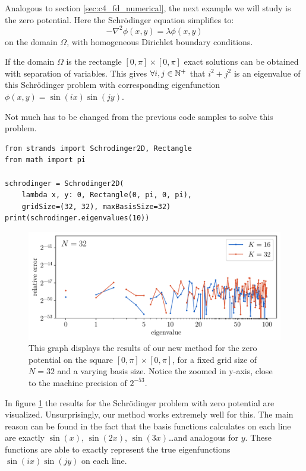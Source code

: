 Analogous to section \ref{sec:c4_fd_numerical}, the next example we will study is the zero potential. Here the Schrödinger equation simplifies to:
$$
    -\nabla^2 \phi(x, y) = \lambda\phi(x, y)
$$
on the domain $\Omega$, with homogeneous Dirichlet boundary conditions.

If the domain $\Omega$ is the rectangle $[0, \pi] \times [0, \pi]$ exact solutions can be obtained with separation of variables. This gives $\forall i, j \in \mathbb{N}^{+}$ that $i^2 + j^2$ is an eigenvalue of this Schrödinger problem with corresponding eigenfunction $\phi(x, y) = \sin(i x)\sin(j y)$.

Not much has to be changed from the previous code samples to solve this problem.
\begin{verbatim}
from strands import Schrodinger2D, Rectangle
from math import pi

schrodinger = Schrodinger2D(
    lambda x, y: 0, Rectangle(0, pi, 0, pi),
    gridSize=(32, 32), maxBasisSize=32)
print(schrodinger.eigenvalues(10))
\end{verbatim}

\begin{figure}
    \begin{center}
        \includegraphics[width=\textwidth]{img/chapter4/nm_test_zero_rectangle.pdf}
    \end{center}
    \caption{This graph displays the results of our new method for the zero potential on the square $[0, \pi] \times [0, \pi]$, for a fixed grid size of $N = 32$ and a varying basis size. Notice the zoomed in y-axis, close to the machine precision of $2^{-53}$.}
    \label{fig:c4_nm_zero_test_rectangle}
\end{figure}

In figure \ref{fig:c4_nm_zero_test_rectangle} the results for the Schrödinger problem with zero potential are visualized. Unsurprisingly, our method works extremely well for this. The main reason can be found in the fact that the basis functions \matslise{} calculates on each line are exactly $\sin(x)$, $\sin(2x)$, $\sin(3x)$\dots and analogous for $y$. These functions are able to exactly represent the true eigenfunctions $\sin(i x)\sin(j y)$ on each line.

